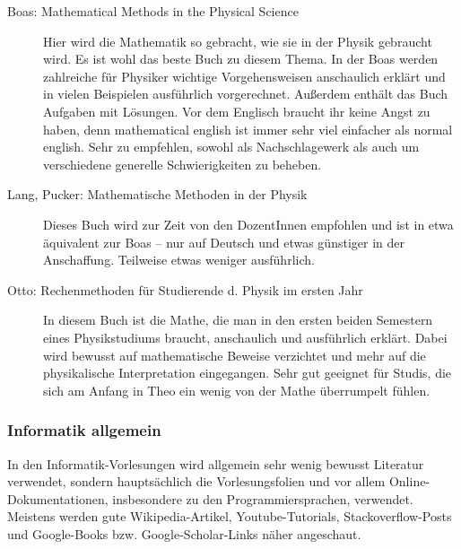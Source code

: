 \begin{description}
\item[Boas: Mathematical Methods in the Physical Science]{
		Hier wird die Mathematik so gebracht, wie sie in der Physik gebraucht wird. Es ist wohl das beste Buch zu diesem Thema. In der Boas werden zahlreiche für Physiker wichtige Vorgehensweisen anschaulich erklärt und in vielen Beispielen ausführlich vorgerechnet. Außerdem enthält das Buch Aufgaben mit Lösungen. Vor dem Englisch braucht ihr keine Angst zu haben, denn mathematical english ist immer sehr viel einfacher als normal english. Sehr zu empfehlen, sowohl als Nachschlagewerk als auch um verschiedene generelle Schwierigkeiten zu beheben.}

\item[Lang, Pucker: Mathematische Methoden in der Physik]{
		Dieses Buch wird zur Zeit von den DozentInnen empfohlen und ist in etwa äquivalent zur Boas -- nur auf Deutsch und etwas günstiger in der Anschaffung. Teilweise etwas weniger ausführlich.}

\item[Otto: Rechenmethoden für Studierende d. Physik im ersten Jahr]{
		In diesem Buch ist die Mathe, die man in den ersten beiden Semestern eines Physikstudiums braucht, anschaulich und ausführlich erklärt. Dabei wird bewusst auf mathematische Beweise verzichtet und mehr auf die physikalische Interpretation eingegangen. Sehr gut geeignet für Studis, die sich am Anfang in Theo ein wenig von der Mathe überrumpelt fühlen.}
\end{description}

\subsubsection{Informatik allgemein}

In den Informatik-Vorlesungen wird allgemein sehr wenig bewusst Literatur verwendet,
sondern hauptsächlich die Vorlesungsfolien und vor allem Online-Dokumentationen,
insbesondere zu den Programmiersprachen, verwendet. Meistens werden gute Wikipedia-Artikel,
Youtube-Tutorials, Stackoverflow-Posts und Google-Books bzw. Google-Scholar-Links näher angeschaut. 

